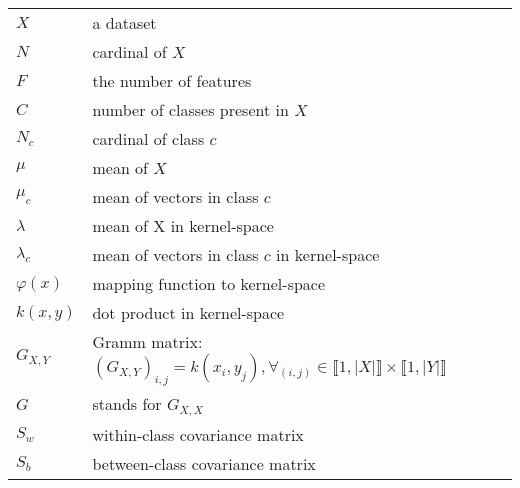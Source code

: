 
\begin{tabular}{ll}
$X$ & a dataset \\
$N$ & cardinal of $X$ \\
$F$ & the number of features\\
$C$ & number of classes present in $X$ \\
$N_c$ & cardinal of class $c$ \\
$\mu$ & mean of $X$ \\
$\mu_c$ & mean of vectors in class $c$ \\
$\lambda$ & mean of X in kernel-space \\
$\lambda_c$ & mean of vectors in class $c$ in kernel-space \\
$\varphi(x)$ & mapping function to kernel-space \\
$k(x, y)$ & dot product in kernel-space \\
$G_{X,Y}$ & Gramm matrix: ${(G_{X,Y})}_{i,j} = k(x_i, y_j), \forall_{(i, j)} \in \llbracket 1, |X|\rrbracket \times \llbracket 1, |Y|\rrbracket $\\
$G$ & stands for ${G_{X,X}}$\\
$S_w$ & within-class covariance matrix \\
$S_b$ & between-class covariance matrix
\end{tabular}

